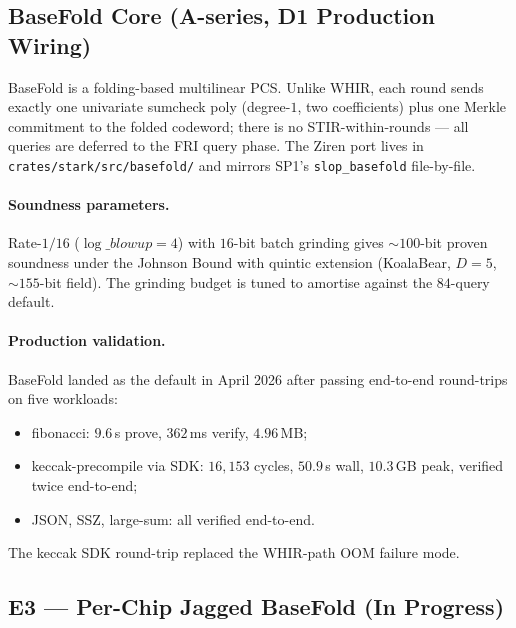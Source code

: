 \subsection{BaseFold Core (A-series, D1 Production Wiring)}

BaseFold is a folding-based multilinear PCS.  Unlike WHIR, each
round sends exactly one univariate sumcheck poly (degree-$1$, two
coefficients) plus one Merkle commitment to the folded codeword;
there is no STIR-within-rounds --- all queries are deferred to the
FRI query phase.  The Ziren port lives in
\texttt{crates/stark/src/basefold/} and mirrors SP1's
\texttt{slop\_basefold} file-by-file.

\paragraph{Soundness parameters.}  Rate-$1/16$
($\log\_blowup = 4$) with $16$-bit batch grinding gives
$\sim 100$-bit proven soundness under the Johnson Bound with
quintic extension (KoalaBear, $D = 5$, $\sim 155$-bit field).  The
grinding budget is tuned to amortise against the $84$-query
default.

\paragraph{Production validation.}  BaseFold landed as the default
in April 2026 after passing end-to-end round-trips on five
workloads:
\begin{itemize}
  \item fibonacci: $9.6$\,s prove, $362$\,ms verify, $4.96$\,MB;
  \item keccak-precompile via SDK: $16{,}153$ cycles, $50.9$\,s
        wall, $10.3$\,GB peak, verified twice end-to-end;
  \item JSON, SSZ, large-sum: all verified end-to-end.
\end{itemize}
The keccak SDK round-trip replaced the WHIR-path OOM failure mode.

\subsection{E3 --- Per-Chip Jagged BaseFold (In Progress)}

